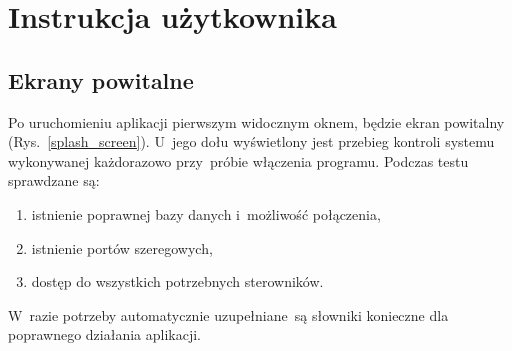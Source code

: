 \section{Instrukcja użytkownika}

\subsection{Ekrany powitalne}

\noindent Po uruchomieniu aplikacji pierwszym widocznym oknem, będzie ekran powitalny (Rys.~\ref{splash_screen}). U~jego dołu wyświetlony jest przebieg kontroli systemu wykonywanej każdorazowo przy~próbie włączenia programu. Podczas testu sprawdzane są:
\begin{enumerate}
\item istnienie poprawnej bazy danych i~możliwość połączenia,
\item istnienie portów szeregowych,
\item dostęp do wszystkich potrzebnych sterowników.
\end{enumerate}
\noindent W~razie potrzeby automatycznie uzupełniane~są słowniki konieczne dla poprawnego działania aplikacji.

